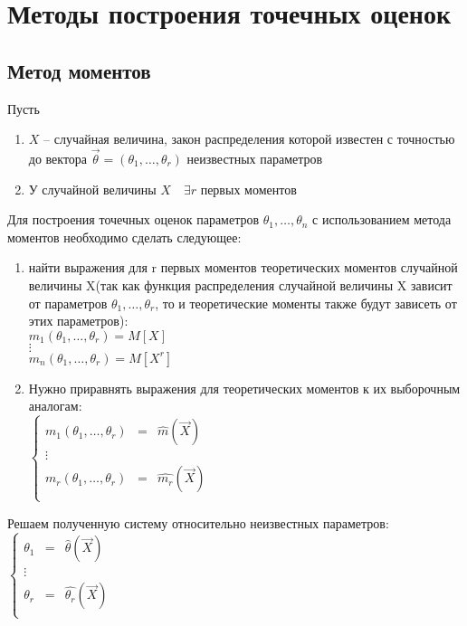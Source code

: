 \documentclass[a4paper, 12pt]{article}
\theoremstyle{definition}
\theoremstyle{leads}
\theoremstyle{example}
\begin{document}
\section{Методы построения точечных оценок}
\subsection{Метод моментов}
Пусть 
\begin{enumerate}
	\item $X$ -- случайная величина, закон распределения которой известен с точностью до вектора $\vec{\theta} = (\theta_1, \dots, \theta_r)$ неизвестных параметров
	\item У случайной величины $X \quad \exists r$ первых моментов  
\end{enumerate}
Для построения точечных оценок параметров $\theta_1, \dots, \theta_n$ с использованием метода моментов необходимо сделать следующее: 
\begin{enumerate}
	\item найти выражения для r первых моментов теоретических моментов случайной величины X(так как функция распределения случайной величины X зависит от параметров $\theta_1, \dots, \theta_r$, то и теоретические моменты также будут зависеть от этих параметров):\\
	$m_1(\theta_1, \dots, \theta_r) = M[X]$\\
	$\vdots$\\
	$m_n(\theta_1, \dots, \theta_r) = M[X^r]$
	
	\item Нужно приравнять выражения для теоретических моментов к их выборочным аналогам:\\
	 $\left \{
	 \begin{array}{ccc}
	 	m_1(\theta_1, \dots, \theta_r)& = &\hat{m}(\vec{X})\\
	 	\vdots\\
	 	m_r(\theta_1, \dots, \theta_r) &= &\hat{m_r}(\vec{X})\\
	 \end{array}
	 \right.$
\end{enumerate}
Решаем полученную систему относительно неизвестных параметров:\\
	 $\left \{
\begin{array}{ccc}
\theta_1 & = &\hat{\theta}(\vec{X})\\
\vdots\\
\theta_r &= &\hat{\theta_r}(\vec{X})\\
\end{array}
\right.$
\end{document}
